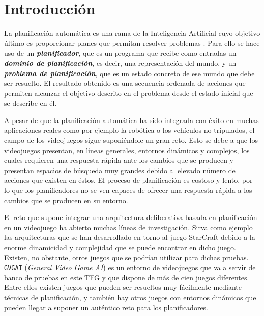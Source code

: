 
\chapter{Introducción}

La planificación automática es una rama de la Inteligencia Artificial cuyo objetivo
último es proporcionar planes que permitan resolver problemas \cite{10.5555/3073924}.
Para ello se hace uso de un \textbf{\textit{planificador}}, que es un programa que recibe
como entradas un \textbf{\textit{dominio de planificación}}, es decir, una representación
del mundo, y un \textbf{\textit{problema de planificación}}, que es un estado concreto de
ese mundo que debe ser resuelto. El resultado obtenido es una secuencia ordenada de acciones
que permiten alcanzar el objetivo descrito en el problema desde el estado
inicial que se describe en él.

A pesar de que la planificación automática ha sido integrada con éxito en muchas aplicaciones
reales como por ejemplo la robótica o los vehículos no tripulados, el campo de los videojuegos
sigue suponiéndole un gran reto. Esto se debe a que los videojuegos presentan, en líneas generales,
entornos dinámicos y complejos, los cuales requieren una respuesta rápida ante los cambios que se producen
y presentan espacios de búsqueda muy grandes debido al elevado número de acciones que existen en éstos.
El proceso de planificación es costoso y lento, por lo que los planificadores no se ven
capaces de ofrecer una respuesta rápida a los cambios que se producen en su entorno.

El reto que supone integrar una arquitectura deliberativa basada en planificación en un videojuego ha
abierto muchas líneas de investigación. Sirva como ejemplo las arquitecturas que se han desarrollado en torno
al juego StarCraft \cite{10.1007/978-3-540-74141-1_12, Churchill2011BuildOO, Weber2011BuildingHA, Aha_2018}
debido a la enorme dinamicidad y complejidad que se puede encontrar en dicho juego.
Existen, no obstante, otros juegos que se podrían utilizar para dichas pruebas.
\texttt{GVGAI} (\textit{General Video Game AI})\cite{7038214} es un entorno de videojuegos que va a
servir de banco de pruebas en este TFG y que dispone de más de cien juegos diferentes. Entre ellos existen juegos que
pueden ser resueltos muy fácilmente mediante técnicas de planificación, y también hay otros juegos con entornos
dinámicos que pueden llegar a suponer un auténtico reto para los planificadores.

